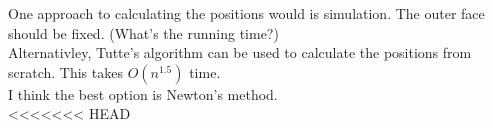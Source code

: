 \documentclass{article}
\begin{document}
One approach to calculating the positions would is simulation. The outer face should be fixed. (What's the running time?)\\
Alternativley, Tutte's algorithm can be used to calculate the positions from scratch. This takes $O(n^{1.5})$ time. \\
I think the best option is Newton's method.\\
<<<<<<< HEAD
\end{document}
